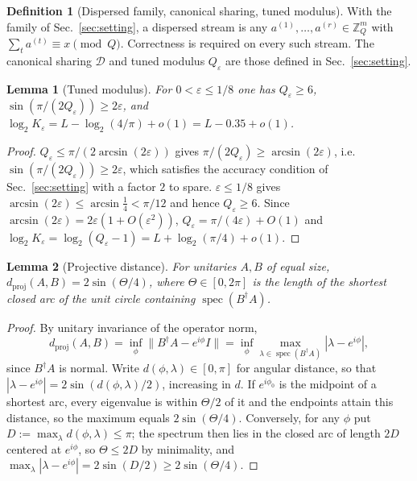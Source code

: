 \documentclass[aps,prx,twocolumn,superscriptaddress,nofootinbib,longbibliography]{revtex4-2}
\theoremstyle{plain}
\newtheorem{lemma}{Lemma}
\theoremstyle{definition}
\newtheorem{definition}{Definition}
\theoremstyle{remark}
\newcommand{\dproj}{d_{\mathrm{proj}}}
\newcommand{\Z}{\mathbb{Z}}
\DeclareMathOperator{\spec}{spec}
\begin{document}
\begin{definition}[Dispersed family, canonical sharing, tuned modulus]\label{def:family}
With the family of Sec.~\ref{sec:setting}, a dispersed stream is any $a^{(1)},\dots,a^{(r)}\in\Z_Q^m$ with $\sum_ta^{(t)}\equiv x\pmod Q$. Correctness is required on every such stream. The canonical sharing $\mathcal D$ and tuned modulus $Q_\varepsilon$ are those defined in Sec.~\ref{sec:setting}.
\end{definition}

\begin{lemma}[Tuned modulus]\label{lem:tuned}
For $0<\varepsilon\le1/8$ one has $Q_\varepsilon\ge6$, $\sin(\pi/(2Q_\varepsilon))\ge2\varepsilon$, and $\log_2K_\varepsilon=L-\log_2(4/\pi)+o(1)=L-0.35+o(1)$.
\end{lemma}
\begin{proof}
$Q_\varepsilon\le\pi/(2\arcsin(2\varepsilon))$ gives $\pi/(2Q_\varepsilon)\ge\arcsin(2\varepsilon)$, i.e.\ $\sin(\pi/(2Q_\varepsilon))\ge2\varepsilon$, which satisfies the accuracy condition of Sec.~\ref{sec:setting} with a factor $2$ to spare. $\varepsilon\le1/8$ gives $\arcsin(2\varepsilon)\le\arcsin\tfrac14<\pi/12$ and hence $Q_\varepsilon\ge6$. Since $\arcsin(2\varepsilon)=2\varepsilon(1+O(\varepsilon^2))$, $Q_\varepsilon=\pi/(4\varepsilon)+O(1)$ and $\log_2K_\varepsilon=\log_2(Q_\varepsilon-1)=L+\log_2(\pi/4)+o(1)$.
\end{proof}

\begin{lemma}[Projective distance]\label{lem:dproj}
For unitaries $A,B$ of equal size, $\dproj(A,B)=2\sin(\Theta/4)$, where $\Theta\in[0,2\pi]$ is the length of the shortest closed arc of the unit circle containing $\spec(B^\dagger A)$.
\end{lemma}
\begin{proof}
By unitary invariance of the operator norm,
\[\dproj(A,B)=\inf_\phi\|B^\dagger A-e^{i\phi}I\|=\inf_\phi\max_{\lambda\in\spec(B^\dagger A)}|\lambda-e^{i\phi}|,\]
since $B^\dagger A$ is normal. Write $d(\phi,\lambda)\in[0,\pi]$ for angular distance, so that $|\lambda-e^{i\phi}|=2\sin(d(\phi,\lambda)/2)$, increasing in $d$. If $e^{i\phi_0}$ is the midpoint of a shortest arc, every eigenvalue is within $\Theta/2$ of it and the endpoints attain this distance, so the maximum equals $2\sin(\Theta/4)$. Conversely, for any $\phi$ put $D:=\max_\lambda d(\phi,\lambda)\le\pi$; the spectrum then lies in the closed arc of length $2D$ centered at $e^{i\phi}$, so $\Theta\le2D$ by minimality, and $\max_\lambda|\lambda-e^{i\phi}|=2\sin(D/2)\ge2\sin(\Theta/4)$.
\end{proof}
\end{document}
